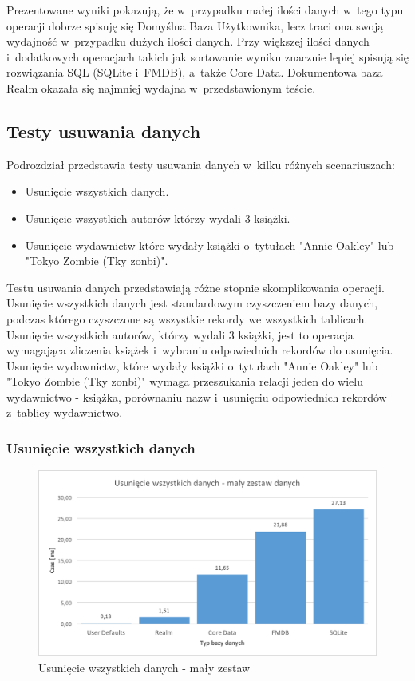 Prezentowane wyniki pokazują, że w~przypadku małej ilości danych w~tego typu operacji dobrze spisuję się Domyślna Baza Użytkownika, lecz traci ona swoją wydajność w~przypadku dużych ilości danych. Przy większej ilości danych i~dodatkowych operacjach takich jak sortowanie wyniku znacznie lepiej spisują się rozwiązania SQL (SQLite i~FMDB), a~także Core Data. Dokumentowa baza Realm okazała się najmniej wydajna w~przedstawionym teście. 

\subsection{Testy usuwania danych}

Podrozdział przedstawia testy usuwania danych w~kilku różnych scenariuszach: 

\begin{itemize}
\item Usunięcie wszystkich danych.
\item Usunięcie wszystkich autorów którzy wydali 3 książki.
\item Usunięcie wydawnictw które wydały książki o~tytułach "Annie Oakley" lub "Tokyo Zombie (Tky zonbi)".
\end{itemize}

Testu usuwania danych przedstawiają różne stopnie skomplikowania operacji. Usunięcie wszystkich danych jest standardowym czyszczeniem bazy danych, podczas którego czyszczone są wszystkie rekordy we wszystkich tablicach. Usunięcie wszystkich autorów, którzy wydali 3 książki, jest to operacja wymagająca zliczenia książek i~wybraniu odpowiednich rekordów do usunięcia. Usunięcie wydawnictw, które wydały książki o~tytułach "Annie Oakley" lub "Tokyo Zombie (Tky zonbi)" wymaga przeszukania relacji jeden do wielu wydawnictwo - książka, porównaniu nazw i~usunięciu odpowiednich rekordów z~tablicy wydawnictwo. 

\subsubsection{Usunięcie wszystkich danych}

\begin{figure}[H]
\centering
	\includegraphics[width=15cm]{img/delete_data/delete_all/delete_all_small_test.png}
	\caption{Usunięcie wszystkich danych - mały zestaw}
	\label{fig: delete-all-small}
\end{figure}


